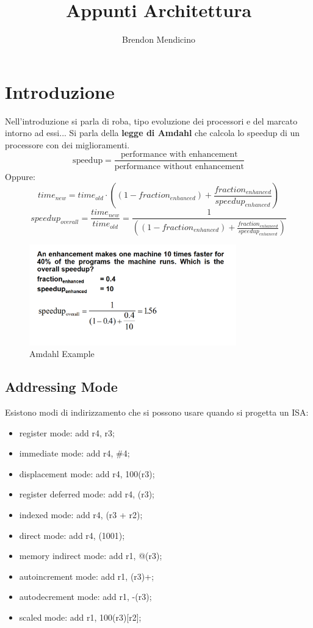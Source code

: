 \documentclass[12pt]{article}
\title{Appunti Architettura}
\author{Brendon Mendicino}
\begin{document}
\maketitle
\newpage
\tableofcontents
\newpage


\section{Introduzione}\label{sec:introduzione}
Nell'introduzione si parla di roba, tipo evoluzione dei processori e del marcato intorno ad essi... Si parla della \textbf{legge di Amdahl} che calcola lo speedup di un processore con dei miglioramenti.
\[ \text{speedup} = \frac{\text{performance with enhancement}}{\text{performance without enhancement}} \]
Oppure:
\[ time_{new} = time_{old} \cdot \left( (1 - fraction_{enhanced}) + \frac{fraction_{enhanced}}{speedup_{enhanced}} \right) \]
\[ speedup_{overall} = \frac{time_{new}}{time_{old}}  = \frac{1}{\left( (1 - fraction_{enhanced}) + \frac{fraction_{enhanced}}{speedup_{enhanced}} \right)} \]
\begin{figure}[H]
    \centering
    \includegraphics[width=0.8\textwidth]{amdahl-example.png}
    \caption{Amdahl Example}
    \label{fig:amdahl-example}
\end{figure}

\subsection{Addressing Mode}
Esistono modi di indirizzamento che si possono usare quando si progetta un ISA:
\begin{itemize}
    \item register mode: add r4, r3;
    \item immediate mode: add r4, \#4;
    \item displacement mode: add r4, 100(r3);
    \item register deferred mode: add r4, (r3);
    \item indexed mode: add r4, (r3 + r2);
    \item direct mode: add r4, (1001); 
    \item memory indirect mode: add r1, @(r3);
    \item autoincrement mode: add r1, (r3)+;
    \item autodecrement mode: add r1, -(r3);
    \item scaled mode: add r1, 100(r3)[r2];
\end{itemize}
\end{document}
